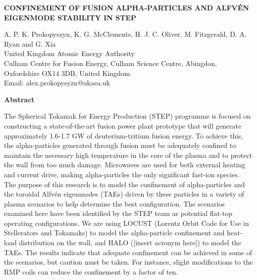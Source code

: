 \documentclass[10pt, a4paper, twoside]{article}
\begin{document}
\begin{flushleft}
\fontsize{12}{14}\selectfont \textbf{CONFINEMENT OF FUSION ALPHA-PARTICLES AND ALFV\'EN EIGENMODE STABILITY IN STEP}

\fontsize{10}{13}\selectfont

A. P. K. Prokopyszyn, K. G. McClements, 
H. J. C. Oliver, M. Fitzgerald, D. A. Ryan and G. Xia \\
United Kingdom Atomic Energy Authority \\
Culham Centre for Fusion Energy, Culham Science Centre, Abingdon, Oxfordshire OX14 3DB, United Kingdom \\
Email: alex.prokopysyzn@ukaea.uk

\end{flushleft}

\begin{flushleft}
\selectfont \textbf{Abstract}
\end{flushleft}

\setlength{\parindent}{1cm}
\fontsize{9}{12pt}\selectfont

The Spherical Tokamak for Energy Production (STEP) programme is focused on constructing a state-of-the-art fusion power plant prototype that will generate approximately 1.6-1.7 GW of deuterium-tritium fusion energy. To achieve this, the alpha-particles generated through fusion must be adequately confined to maintain the necessary high temperature in the core of the plasma and to protect the wall from too much damage. Microwaves are used for both external heating and current drive, making alpha-particles the only significant fast-ion species. The purpose of this research is to model the confinement of alpha-particles and the toroidal Alfvén eigenmodes (TAEs) driven by these particles in a variety of plasma scenarios to help determine the best configuration. The scenarios examined here have been identified by the STEP team as potential flat-top operating configurations. We are using LOCUST (Lorentz Orbit Code for Use in Stellerators and Tokamaks) to model the alpha-particle confinement and heat-load distribution on the wall, and HALO ([insert acronym here]) to model the TAEs. The results indicate that adequate confinement can be achieved in some of the scenarios, but caution must be taken. For instance, slight modifications to the RMP coils can reduce the confinement by a factor of ten.


\setlength{\parindent}{0pt}
\fontsize{10}{13}\selectfont
\end{document}
